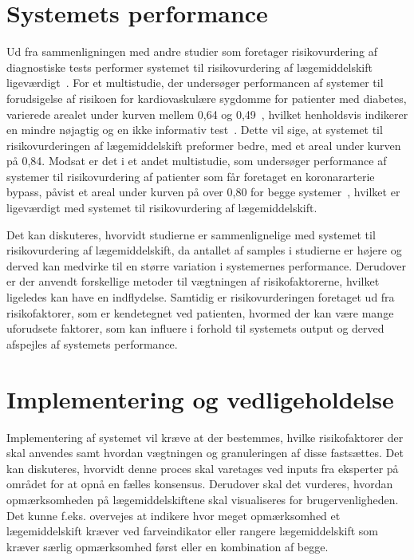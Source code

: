 \section{Systemets performance}
Ud fra sammenligningen med andre studier som foretager risikovurdering af diagnostiske tests performer systemet til risikovurdering af lægemiddelskift ligeværdigt~\citep{Chan2009,VanStraten2010}. For et multistudie, der undersøger performancen af systemer til forudsigelse af risikoen for kardiovaskulære sygdomme for patienter med diabetes, varierede arealet under kurven mellem 0,64 og 0,49~\citep{Chan2009}, hvilket henholdsvis indikerer en mindre nøjagtig og en ikke informativ test~\citep{Greiner2000}. Dette vil sige, at systemet til risikovurderingen af lægemiddelskift preformer bedre, med et areal under kurven på 0,84. Modsat er det i et andet multistudie, som undersøger performance af systemer til risikovurdering af patienter som får foretaget en koronararterie bypass, påvist et areal under kurven på over 0,80 for begge systemer~\citep{VanStraten2010}, hvilket er ligeværdigt med systemet til risikovurdering af lægemiddelskift.

Det kan diskuteres, hvorvidt studierne er sammenlignelige med systemet til risikovurdering af lægemiddelskift, da antallet af samples i studierne er 
højere og derved kan medvirke til en større variation i systemernes performance. Derudover er der anvendt forskellige metoder til vægtningen af risikofaktorerne, hvilket ligeledes kan have en indflydelse. Samtidig er  risikovurderingen foretaget ud fra risikofaktorer, som er kendetegnet ved patienten, hvormed der kan være mange uforudsete faktorer, som kan influere i forhold til systemets output og derved afspejles af systemets performance. 

\section{Implementering og vedligeholdelse}
Implementering af systemet vil kræve at der bestemmes, hvilke risikofaktorer der skal anvendes samt hvordan vægtningen og granuleringen af disse fastsættes. Det kan diskuteres, hvorvidt denne proces skal varetages ved inputs fra eksperter på området for at opnå en fælles konsensus. Derudover skal det vurderes, hvordan opmærksomheden på lægemiddelskiftene skal visualiseres for brugervenligheden. Det kunne f.eks. overvejes at indikere hvor meget opmærksomhed et lægemiddelskift kræver ved farveindikator eller rangere lægemiddelskift som kræver særlig opmærksomhed først eller en kombination af begge.

